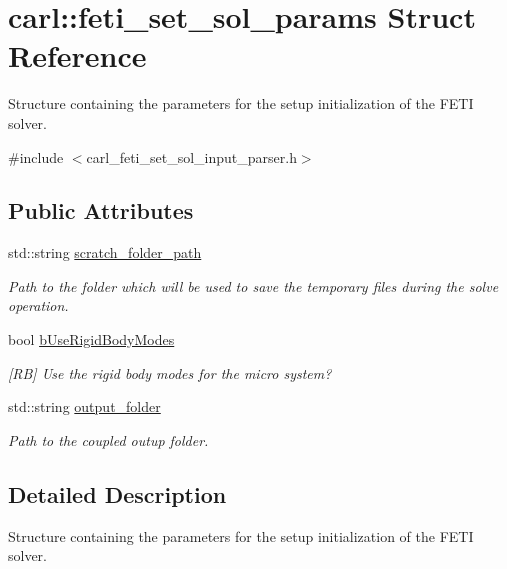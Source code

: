 \hypertarget{structcarl_1_1feti__set__sol__params}{}\section{carl\+:\+:feti\+\_\+set\+\_\+sol\+\_\+params Struct Reference}
\label{structcarl_1_1feti__set__sol__params}


Structure containing the parameters for the setup initialization of the F\+E\+T\+I solver.  




{\ttfamily \#include $<$carl\+\_\+feti\+\_\+set\+\_\+sol\+\_\+input\+\_\+parser.\+h$>$}

\subsection*{Public Attributes}
\begin{DoxyCompactItemize}
\item 
std\+::string \hyperlink{structcarl_1_1feti__set__sol__params_ab6ddbeabd05fc4250a25c3c7f8efcdb9}{scratch\+\_\+folder\+\_\+path}
\begin{DoxyCompactList}\small\item\em Path to the folder which will be used to save the temporary files during the solve operation. \end{DoxyCompactList}\item 
bool \hyperlink{structcarl_1_1feti__set__sol__params_aecd85116814599f3edb193f4dabfaf49}{b\+Use\+Rigid\+Body\+Modes}
\begin{DoxyCompactList}\small\item\em \mbox{[}R\+B\mbox{]} Use the rigid body modes for the micro system? \end{DoxyCompactList}\item 
std\+::string \hyperlink{structcarl_1_1feti__set__sol__params_a7adec03a37edb92e1519066423844ccd}{output\+\_\+folder}
\begin{DoxyCompactList}\small\item\em Path to the coupled outup folder. \end{DoxyCompactList}\end{DoxyCompactItemize}


\subsection{Detailed Description}
Structure containing the parameters for the setup initialization of the F\+E\+T\+I solver. 

